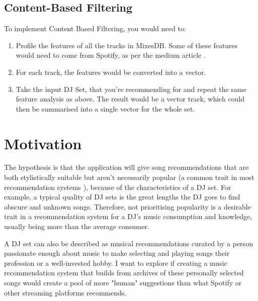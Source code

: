 \documentclass[11pt,titlepage,oneside]{book}
\begin{document}
  \subsection{Content-Based Filtering}
  To implement Content Based Filtering, you would need to:
 \begin{enumerate}
 	
 	\item  Profile the features of all the tracks in MixesDB. Some of these features would need to come from Spotify, as per the medium article \citep{chow_music_2020}.
 	
 	\item For each track, the features would be converted into a vector.
 	
 	\item Take the input DJ Set, that you're recommending for and repeat the same feature analysis as above. The result would be a vector track, which could then be summarised into a single vector for the whole set.
 	
 \end{enumerate}

\section{Motivation}

	The hypothesis is that the application will give song recommendations that are both stylistically suitable but aren't necessarily popular (a common trait in most recommendation systems \citep{lesota_analyzing_2021}), because of the characteristics of a DJ set. For example, a typical quality of DJ sets is the great lengths the DJ goes to find obscure and unknown songs. Therefore, not prioritising popularity is a desirable trait in a recommendation system for a DJ's music consumption and knowledge, usually being more than the average consumer. 
	
	\begin{flushleft}
		
		A DJ set can also be described as musical recommendations curated by a person passionate enough about music to make selecting and playing songs their profession or a well-invested hobby. I want to explore if creating a music recommendation system that builds from archives of these personally selected songs would create a pool of more "human" suggestions than what Spotify or other streaming platforms recommends.
		
	\end{flushleft}
	
\end{document}
